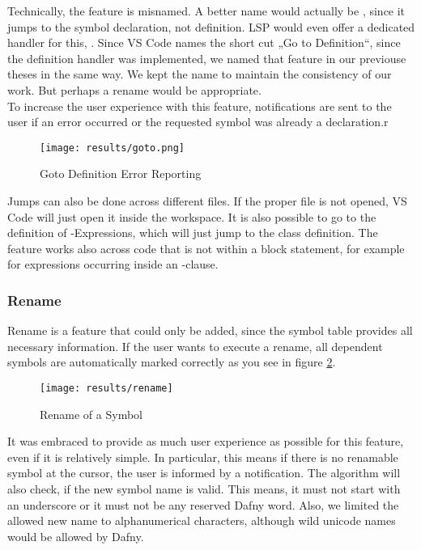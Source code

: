 Technically, the feature is misnamed.
A better name would actually be , since it jumps to the symbol declaration, not definition.
LSP would even offer a dedicated handler for this,  \cite{lspspec}.
Since VS Code names the short cut „Go to Definition“, since the definition handler was implemented, we named that feature in our previouse theses in the same way.
We kept the name to maintain the consistency of our work.
But perhaps a rename would be appropriate.   \\

To increase the user experience with this feature, notifications are sent to the user if an error occurred or the requested symbol was already a declaration.r
\begin{figure}[h]
    \centering
    \texttt{[image: results/goto.png]}
    \caption{Goto Definition Error Reporting}
    \label{fig:goto}
\end{figure}


Jumps can also be done across different files.
If the proper file is not opened, VS Code will just open it inside the workspace.
It is also possible to go to the definition of -Expressions, which will just jump to the class definition.
The feature works also across code that is not within a block statement, for example for expressions occurring inside an -clause.

\subsubsection{Rename}
Rename is a feature that could only be added, since the symbol table provides all necessary information.
If the user wants to execute a rename, all dependent symbols are automatically marked correctly as you see in figure \ref{fig:rename}.

\begin{figure}[H]
    \centering
    \texttt{[image: results/rename]}
    \caption{Rename of a Symbol}
    \label{fig:rename}
\end{figure}

It was embraced to provide as much user experience as possible for this feature, even if it is relatively simple.
In particular, this means if there is no renamable symbol at the cursor, the user is informed by a notification.
The algorithm will also check, if the new symbol name is valid.
This means, it must not start with an underscore or it must not be any reserved Dafny word.
Also, we limited the allowed new name to alphanumerical characters, although wild unicode names would be allowed by Dafny.\\

